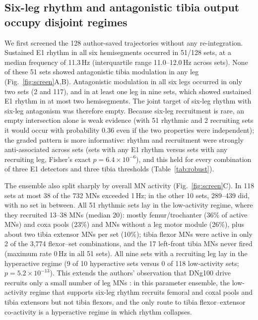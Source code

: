 \documentclass[11pt]{article}
\begin{document}
\subsection{Six-leg rhythm and antagonistic tibia output occupy disjoint regimes}
\label{sec:r1}
We first screened the 128 author-saved trajectories without any re-integration. Sustained E1 rhythm in all six hemisegments occurred in 51/128 sets, at a median frequency of 11.3\,Hz (interquartile range 11.0--12.0\,Hz across sets). None of these 51 sets showed antagonistic tibia modulation in any leg (Fig.~\ref{fig:screen}A,B). Antagonistic modulation in all six legs occurred in only two sets (2 and 117), and in at least one leg in nine sets, which showed sustained E1 rhythm in at most two hemisegments. The joint target of six-leg rhythm with six-leg antagonism was therefore empty. Because six-leg recruitment is rare, an empty intersection alone is weak evidence (with 51 rhythmic and 2 recruiting sets it would occur with probability 0.36 even if the two properties were independent); the graded pattern is more informative: rhythm and recruitment were strongly anti-associated across sets (sets with any E1 rhythm versus sets with any recruiting leg, Fisher's exact $p=6.4\times10^{-6}$), and this held for every combination of three E1 detectors and three tibia thresholds (Table~\ref{tab:robust}).

The ensemble also split sharply by overall MN activity (Fig.~\ref{fig:screen}C). In 118 sets at most 38 of the 732 MNs exceeded 1\,Hz; in the other 10 sets, 289--439 did, with no set in between. All 51 rhythmic sets lay in the low-activity regime, where they recruited 13--38 MNs (median 20): mostly femur/trochanter (36\% of active MNs) and coxa pools (23\%) and MNs without a leg motor module (26\%), plus about two tibia extensor MNs per set (10\%); tibia flexor MNs were active in only 2 of the 3,774 flexor--set combinations, and the 17 left-front tibia MNs never fired (maximum rate 0\,Hz in all 51 sets). All nine sets with a recruiting leg lay in the hyperactive regime (9 of 10 hyperactive sets versus 0 of 118 low-activity sets; $p=5.2\times10^{-13}$). This extends the authors' observation that DNg100 drive recruits only a small number of leg MNs \citep{pugliese2026}: in this parameter ensemble, the low-activity regime that supports six-leg rhythm recruits femoral and coxal pools and tibia extensors but not tibia flexors, and the only route to tibia flexor--extensor co-activity is a hyperactive regime in which rhythm collapses.
\end{document}
